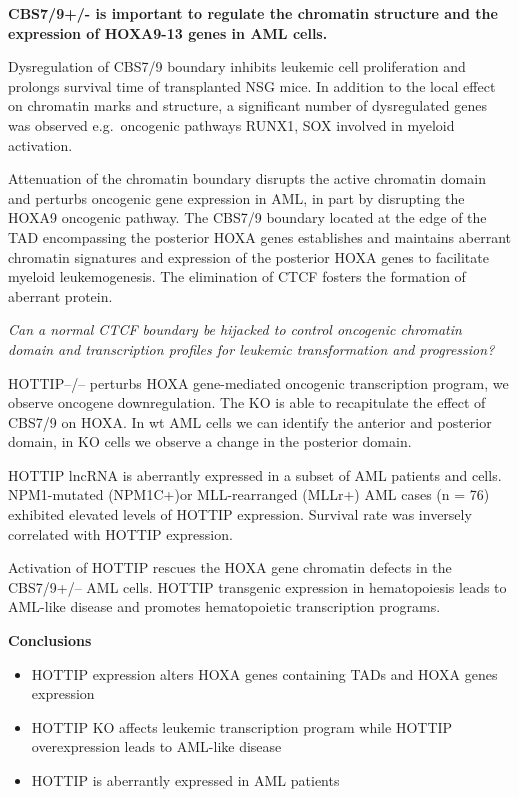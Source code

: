 \textbf{CBS7/9+/- is important to regulate the chromatin structure and the expression of HOXA9-13 genes in AML cells.}

Dysregulation of CBS7/9 boundary inhibits leukemic cell proliferation and prolongs survival time of transplanted NSG mice. In addition to the local effect on chromatin marks and structure, a significant number of dysregulated genes was observed e.g.~oncogenic pathways RUNX1, SOX involved in myeloid activation.

Attenuation of the chromatin boundary disrupts the active chromatin domain and perturbs oncogenic gene expression in AML, in part by disrupting the HOXA9 oncogenic pathway. The CBS7/9 boundary located at the edge of the TAD encompassing the posterior HOXA genes establishes and maintains aberrant chromatin signatures and expression of the posterior HOXA genes to facilitate myeloid leukemogenesis. The elimination of CTCF fosters the formation of aberrant protein.

\emph{Can a normal CTCF boundary be hijacked to control oncogenic chromatin domain and transcription profiles for leukemic transformation and progression?}

HOTTIP--/-- perturbs HOXA gene-mediated oncogenic transcription program, we observe oncogene downregulation. The KO is able to recapitulate the effect of CBS7/9 on HOXA. In wt AML cells we can identify the anterior and posterior domain, in KO cells we observe a change in the posterior domain.

HOTTIP lncRNA is aberrantly expressed in a subset of AML patients and cells. NPM1-mutated (NPM1C+)or MLL-rearranged (MLLr+) AML cases (n = 76) exhibited elevated levels of HOTTIP expression. Survival rate was inversely correlated with HOTTIP expression.

Activation of HOTTIP rescues the HOXA gene chromatin defects in the CBS7/9+/-- AML cells. HOTTIP transgenic expression in hematopoiesis leads to AML-like disease and promotes hematopoietic transcription programs.

\textbf{Conclusions}
\begin{itemize}
\tightlist
\item
  HOTTIP expression alters HOXA genes containing TADs and HOXA genes expression
\item
  HOTTIP KO affects leukemic transcription program while HOTTIP overexpression leads to AML-like disease
\item
  HOTTIP is aberrantly expressed in AML patients
\end{itemize}

